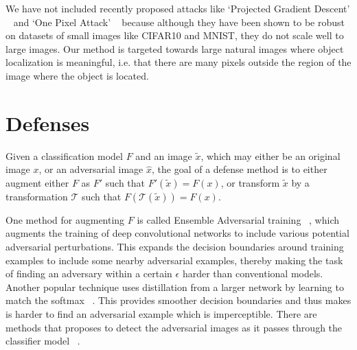 We have not included recently proposed attacks like `Projected Gradient Descent' ~\cite{Madry2017TowardsDL} and `One Pixel Attack' ~\cite{Su2017OnePA} because although they have been shown to be robust on datasets of small images like CIFAR10 and MNIST, they do not scale well to large images. 
Our method is targeted towards large natural images where object localization is meaningful, i.e. that there are many  pixels outside the region of the image where the object is located.


\section{Defenses\label{sec:defenses}}

Given a classification model $F$ and an image $\tilde{x}$, which may either be an original image $x$, or an adversarial image $\hat{x}$, the goal of a defense method is to either augment either $F$ as $F'$ such that $F'(\tilde{x}) = F(x)$, or transform $\tilde{x}$ by a transformation $\mathcal{T}$ such that $F(\mathcal{T}(\tilde{x}))=F(x)$.

One method for augmenting $F$ is called Ensemble Adversarial training ~\cite{Tramr2017EnsembleAT},  which augments the training of  deep convolutional networks to include various potential adversarial perturbations. 
This expands the decision boundaries around training examples to include some nearby adversarial examples, thereby making the task of finding an adversary within a certain $\epsilon$ harder than conventional models.
Another popular technique uses distillation from a larger network by learning to match the 
softmax ~\cite{Papernot2016DistillationAA}.
This provides smoother decision boundaries and thus makes is harder to find an adversarial example which is imperceptible.
There are methods that proposes to detect the adversarial images as it passes through the classifier model ~\cite{Meng2017MagNetAT,akhtar2017defense}.

